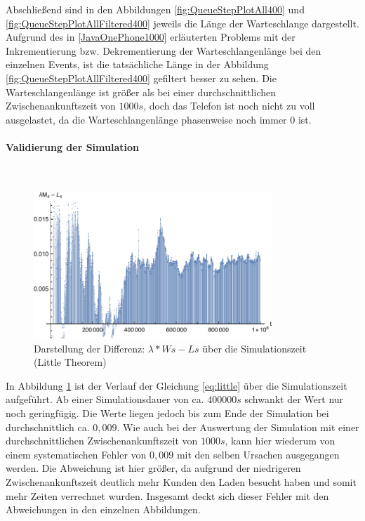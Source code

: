 Abschließend sind in den Abbildungen \ref{fig:QueueStepPlotAll400} und \ref{fig:QueueStepPlotAllFiltered400} jeweils die Länge der Warteschlange dargestellt. Aufgrund des in \ref{JavaOnePhone1000} erläuterten Problems mit der Inkrementierung bzw. Dekrementierung der Warteschlangenlänge bei den einzelnen Events, ist die tatsächliche Länge in der Abbildung \ref{fig:QueueStepPlotAllFiltered400} gefiltert besser zu sehen. Die Warteschlangenlänge ist größer als bei einer durchschnittlichen Zwischenankunftszeit von $1000s$, doch das Telefon ist noch nicht zu voll ausgelastet, da die Warteschlangenlänge phasenweise noch immer $0$ ist.


\paragraph{Validierung der Simulation}
\\
\begin{figure}[htpb]
	\centering
	\includegraphics[width=0.8\textwidth]{abbildungen/1_Phone/Arrival_400_Serve_100_dur_1000000_Skip_0/LittleSystem.pdf}
	\caption{Darstellung der Differenz: $\lambda * Ws - Ls$ über die Simulationszeit (Little Theorem)}
	\label{fig:LittleSystem400}
\end{figure}

In Abbildung \ref{fig:LittleSystem400} ist der Verlauf der Gleichung \ref{eq:little} über die Simulationszeit aufgeführt. Ab einer Simulationsdauer von ca. $400000s$ schwankt der Wert nur noch geringfügig. Die Werte liegen jedoch bis zum Ende der Simulation bei durchschnittlich ca. $0,009$. Wie auch bei der Auswertung der Simulation mit einer durchschnittlichen Zwischenankunftszeit von $1000s$, kann hier wiederum von einem systematischen Fehler von $0,009$ mit den selben Ursachen ausgegangen werden. Die Abweichung ist hier größer, da aufgrund der niedrigeren Zwischenankunftszeit deutlich mehr Kunden den Laden besucht haben und somit mehr Zeiten verrechnet wurden. Insgesamt deckt sich dieser Fehler mit den Abweichungen in den einzelnen Abbildungen.

